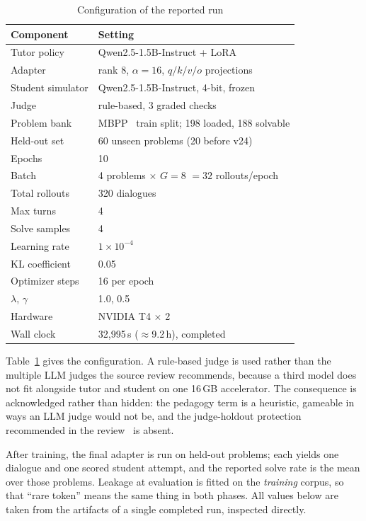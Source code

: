 \documentclass[conference]{IEEEtran}
\begin{document}
\begin{table}[t]
\caption{Configuration of the reported run}
\label{tab:config}
\centering
\small
\begin{tabular}{ll}
\toprule
\textbf{Component} & \textbf{Setting} \\
\midrule
Tutor policy      & Qwen2.5-1.5B-Instruct + LoRA~\cite{lora} \\
Adapter           & rank 8, $\alpha=16$, $q/k/v/o$ projections \\
Student simulator & Qwen2.5-1.5B-Instruct, 4-bit, frozen \\
Judge             & rule-based, 3 graded checks \\
Problem bank      & MBPP~\cite{mbpp} train split; 198 loaded, 188 solvable \\
Held-out set      & 60 unseen problems (20 before v24) \\
Epochs            & 10 \\
Batch             & 4 problems $\times$ $G=8$ $=32$ rollouts/epoch \\
Total rollouts    & 320 dialogues \\
Max turns         & 4 \\
Solve samples     & 4 \\
Learning rate     & $1\times10^{-4}$ \\
KL coefficient    & 0.05 \\
Optimizer steps   & 16 per epoch \\
$\lambda$, $\gamma$ & 1.0, 0.5 \\
Hardware          & NVIDIA T4 $\times$ 2 \\
Wall clock        & 32{,}995\,s ($\approx$9.2\,h), completed \\
\bottomrule
\end{tabular}
\end{table}

Table~\ref{tab:config} gives the configuration. A rule-based judge is used
rather than the multiple LLM judges the source review recommends, because a
third model does not fit alongside tutor and student on one 16\,GB
accelerator. The consequence is acknowledged rather than hidden: the
pedagogy term is a heuristic, gameable in ways an LLM judge would not be,
and the judge-holdout protection recommended in the
review~\cite{rev-simstudents} is absent.

After training, the final adapter is run on held-out problems; each yields
one dialogue and one scored student attempt, and the reported solve rate is
the mean over those problems. Leakage at evaluation is fitted on the
\emph{training} corpus, so that ``rare token'' means the same thing in both
phases. All values below are taken from the artifacts of a single completed
run, inspected directly.
\end{document}
